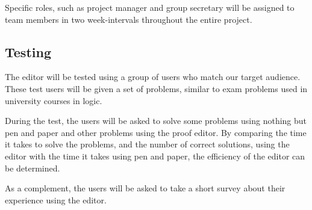 Specific roles, such as project manager and group secretary will be assigned to team members in two week-intervals throughout the entire project.

\subsection{Testing}
The editor will be tested using a group of users who match our target audience. These test users will be given a set of problems, similar to exam problems used in university courses in logic.

During the test, the users will be asked to solve some problems using nothing
but pen and paper and other problems using the proof editor. By comparing the
time it takes to solve the problems, and the number of correct solutions,  using the editor with the time it takes using pen and paper, the efficiency of the editor can be determined.

As a complement, the users will be asked to take a short survey about their experience using the editor.